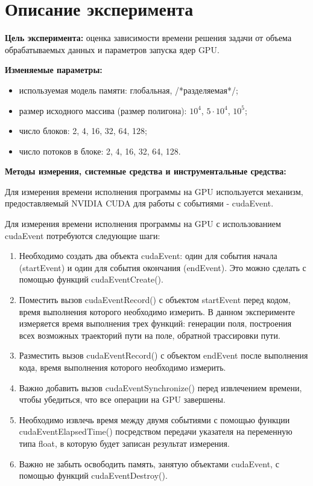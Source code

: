 \documentclass[a4paper, 12pt]{article}
\begin{document}
    \clearpage
    \section{Описание эксперимента}
    \textbf{Цель эксперимента:} оценка зависимости времени решения задачи от объема обрабатываемых данных и параметров запуска ядер GPU.
    \medskip \par
    \textbf{Изменяемые параметры:} 
    \begin{itemize}
        \item используемая модель памяти: глобальная, /*разделяемая*/;
        \item размер исходного массива (размер полигона): $10^4$, $5\cdot10^4$, $10^5$;
        \item число блоков: 2, 4, 16, 32, 64, 128;
        \item число потоков в блоке: 2, 4, 16, 32, 64, 128.
    \end{itemize}
    
    \textbf{Методы измерения, системные средства и инструментальные средства:}
    
    Для измерения времени исполнения программы на GPU используется механизм, предоставляемый NVIDIA CUDA для работы с событиями - cudaEvent. 
    
    Для измерения времени исполнения программы на GPU с использованием cudaEvent  потребуются следующие шаги:
    \begin{enumerate}
        \item Необходимо создать два объекта cudaEvent: один для события начала (startEvent) и один для события окончания (endEvent). Это можно сделать с помощью функций cudaEventCreate().
        \item Поместить вызов cudaEventRecord() с объектом startEvent перед кодом, время выполнения которого необходимо измерить. В данном эксперименте измеряется время выполнения трех функций: генерации поля, построения всех возможных траекторий пути на поле, обратной трассировки пути.
        \item Разместить вызов cudaEventRecord() с объектом endEvent после выполнения кода, время выполнения которого необходимо измерить.
        \item Важно добавить вызов cudaEventSynchronize() перед извлечением времени, чтобы убедиться, что все операции на GPU завершены.
        \item Необходимо извлечь время между двумя событиями с помощью функции \linebreak cudaEventElapsedTime() посредством передачи указателя на переменную типа float, в которую будет записан результат измерения.
        \item Важно не забыть освободить память, занятую объектами cudaEvent, с помощью функций cudaEventDestroy().
    \end{enumerate}
    
\end{document}
